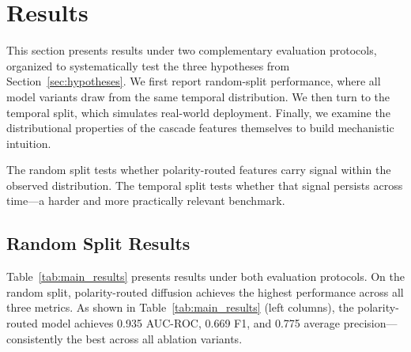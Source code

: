 \documentclass[preprint,12pt,authoryear]{elsarticle}
\begin{document}
\section{Results}
\label{sec:results}

This section presents results under two complementary evaluation protocols, organized to systematically test the three hypotheses from Section~\ref{sec:hypotheses}. We first report random-split performance, where all model variants draw from the same temporal distribution. We then turn to the temporal split, which simulates real-world deployment. Finally, we examine the distributional properties of the cascade features themselves to build mechanistic intuition.

The random split tests whether polarity-routed features carry signal within the observed distribution. The temporal split tests whether that signal persists across time---a harder and more practically relevant benchmark.

\subsection{Random Split Results}
\label{sec:random_results}

Table~\ref{tab:main_results} presents results under both evaluation protocols. On the random split, polarity-routed diffusion achieves the highest performance across all three metrics. As shown in Table~\ref{tab:main_results} (left columns), the polarity-routed model achieves 0.935 AUC-ROC, 0.669 F1, and 0.775 average precision---consistently the best across all ablation variants.
\end{document}
